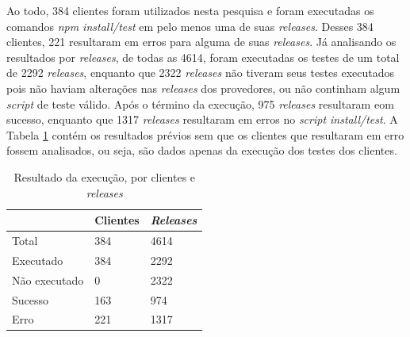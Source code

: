 

Ao todo, 384 clientes foram utilizados nesta pesquisa e foram executadas os comandos \textit{npm install/test} em pelo menos uma de suas \textit{releases}. Desses 384 clientes, 221 resultaram em erros para alguma de suas \textit{releases}. Já analisando os resultados por \textit{releases}, de todas as 4614, foram executadas os testes de um total de 2292 \textit{releases}, enquanto que 2322 \textit{releases} não tiveram seus testes executados pois não haviam alterações nas \textit{releases} dos provedores, ou não continham algum \textit{script} de teste válido. Após o término da execução, 975 \textit{releases} resultaram eom sucesso, enquanto que 1317 \textit{releases} resultaram em erros no \textit{script install/test}. A Tabela \ref{tab:res_rq1_1} contém os resultados prévios sem que os clientes que resultaram em erro fossem analisados, ou seja, são dados apenas da execução dos testes dos clientes.

\begin{table}[]
\centering
\begin{tabular}{|l|l|l|}
\hline
                    & Clientes & \textit{Releases} \\ \hline
    Total           & 384     & 4614     \\
    Executado       & 384     & 2292     \\
    Não executado   & 0       & 2322     \\
    Sucesso         & 163     & 974     \\
    Erro            & 221     & 1317     \\ \hline
\end{tabular}
\caption{Resultado da execução, por clientes e \textit{releases}}
\label{tab:res_rq1_1}
\end{table}

